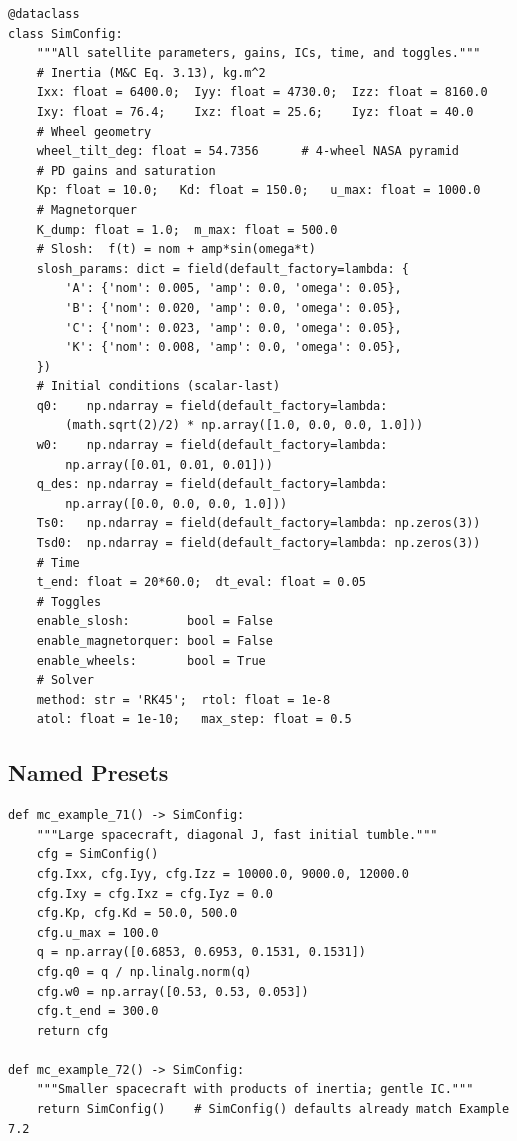 \begin{lstlisting}
@dataclass
class SimConfig:
    """All satellite parameters, gains, ICs, time, and toggles."""
    # Inertia (M&C Eq. 3.13), kg.m^2
    Ixx: float = 6400.0;  Iyy: float = 4730.0;  Izz: float = 8160.0
    Ixy: float = 76.4;    Ixz: float = 25.6;    Iyz: float = 40.0
    # Wheel geometry
    wheel_tilt_deg: float = 54.7356      # 4-wheel NASA pyramid
    # PD gains and saturation
    Kp: float = 10.0;   Kd: float = 150.0;   u_max: float = 1000.0
    # Magnetorquer
    K_dump: float = 1.0;  m_max: float = 500.0
    # Slosh:  f(t) = nom + amp*sin(omega*t)
    slosh_params: dict = field(default_factory=lambda: {
        'A': {'nom': 0.005, 'amp': 0.0, 'omega': 0.05},
        'B': {'nom': 0.020, 'amp': 0.0, 'omega': 0.05},
        'C': {'nom': 0.023, 'amp': 0.0, 'omega': 0.05},
        'K': {'nom': 0.008, 'amp': 0.0, 'omega': 0.05},
    })
    # Initial conditions (scalar-last)
    q0:    np.ndarray = field(default_factory=lambda:
        (math.sqrt(2)/2) * np.array([1.0, 0.0, 0.0, 1.0]))
    w0:    np.ndarray = field(default_factory=lambda:
        np.array([0.01, 0.01, 0.01]))
    q_des: np.ndarray = field(default_factory=lambda:
        np.array([0.0, 0.0, 0.0, 1.0]))
    Ts0:   np.ndarray = field(default_factory=lambda: np.zeros(3))
    Tsd0:  np.ndarray = field(default_factory=lambda: np.zeros(3))
    # Time
    t_end: float = 20*60.0;  dt_eval: float = 0.05
    # Toggles
    enable_slosh:        bool = False
    enable_magnetorquer: bool = False
    enable_wheels:       bool = True
    # Solver
    method: str = 'RK45';  rtol: float = 1e-8
    atol: float = 1e-10;   max_step: float = 0.5
\end{lstlisting}

\subsection{Named Presets}

\begin{lstlisting}
def mc_example_71() -> SimConfig:
    """Large spacecraft, diagonal J, fast initial tumble."""
    cfg = SimConfig()
    cfg.Ixx, cfg.Iyy, cfg.Izz = 10000.0, 9000.0, 12000.0
    cfg.Ixy = cfg.Ixz = cfg.Iyz = 0.0
    cfg.Kp, cfg.Kd = 50.0, 500.0
    cfg.u_max = 100.0
    q = np.array([0.6853, 0.6953, 0.1531, 0.1531])
    cfg.q0 = q / np.linalg.norm(q)
    cfg.w0 = np.array([0.53, 0.53, 0.053])
    cfg.t_end = 300.0
    return cfg

def mc_example_72() -> SimConfig:
    """Smaller spacecraft with products of inertia; gentle IC."""
    return SimConfig()    # SimConfig() defaults already match Example 7.2
\end{lstlisting}

